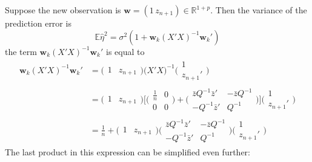 \documentclass[a4paper]{article}
\newcommand{\w}{\mathbf{w}}
\newcommand{\Real}{\mathbb{R}}
\newcommand{\Ex}{\mathbb{E}}
\begin{document}
Suppose the new observation is $\w = ( 1\, z_{n+1} )\in \Real^{1+p}$.
Then the variance of the prediction error is 
\[\Ex \hat{\eta}^2 = \sigma^2( 1 + \w_k (X'X)^{-1} \w_k' )\]
the term $\w_k (X'X)^{-1} \w_k'$ is equal to
\begin{align*}
	\w_k (X'X)^{-1} \w_k'
	&= \big( \begin{matrix} 1 & z_{n+1} \end{matrix} \big) \big(X'X\big)^{-1}  \bigg(\begin{matrix}1 \\ z_{n+1}'\end{matrix}\bigg)\\
	&= \big( \begin{matrix} 1 & z_{n+1} \end{matrix} \big) \Bigg[ \bigg(\begin{matrix} \frac{1}{n} & 0 \\ 0 & 0 \end{matrix}\bigg) + \bigg(\begin{matrix} \bar{z} Q^{-1} \bar{z}' & - \bar{z} Q^{-1} \\ - Q^{-1} \bar{z}' & Q^{-1} \end{matrix}\bigg) \Bigg]  \bigg(\begin{matrix}1 \\ z_{n+1}'\end{matrix}\bigg)\\
	&= \frac{1}{n} + \big( \begin{matrix} 1 & z_{n+1} \end{matrix} \big) \bigg(\begin{matrix} \bar{z} Q^{-1} \bar{z}' & - \bar{z} Q^{-1} \\ - Q^{-1} \bar{z}' & Q^{-1} \end{matrix}\bigg) \bigg(\begin{matrix}1 \\ z_{n+1}'\end{matrix}\bigg)
\end{align*}
The last product in this expression can be simplified even further:
\end{document}
